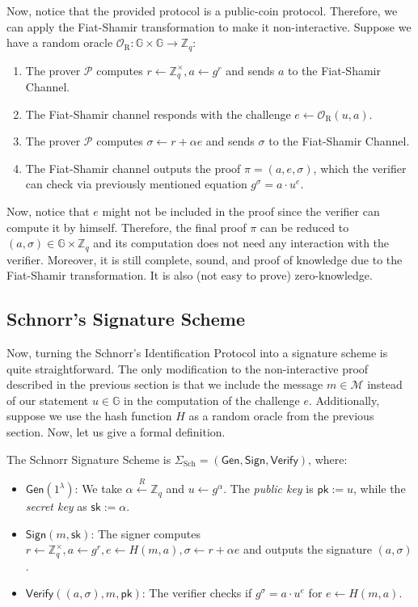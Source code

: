 \documentclass[../lecture-notes-148x210.tex]{subfiles}
\begin{document}
Now, notice that the provided protocol is a public-coin protocol. Therefore, we can apply the Fiat-Shamir transformation to make it non-interactive. Suppose we have a random oracle $\mathcal{O}_{\text{R}}: \mathbb{G} \times \mathbb{G} \to \mathbb{Z}_q$:
\begin{enumerate}
    \item The prover $\mathcal{P}$ computes $r \gets \mathbb{Z}_q^{\times}, a \gets g^{r}$ and sends $a$ to the Fiat-Shamir Channel.
    \item The Fiat-Shamir channel responds with the challenge $e \gets \mathcal{O}_{\text{R}}(u,a)$.
    \item The prover $\mathcal{P}$ computes $\sigma \gets r + \alpha e$ and sends $\sigma$ to the Fiat-Shamir Channel.
    \item The Fiat-Shamir channel outputs the proof $\pi = (a,e,\sigma)$, which the verifier can check via previously mentioned equation $g^{\sigma} = a \cdot u^e$.
\end{enumerate}

Now, notice that $e$ might not be included in the proof since the verifier can compute it by himself. Therefore, the final proof $\pi$ can be reduced to $(a,\sigma) \in \mathbb{G} \times \mathbb{Z}_q$ and its computation does not need any interaction with the verifier. Moreover, it is still complete, sound, and proof of knowledge due to the Fiat-Shamir transformation. It is also (not easy to prove) zero-knowledge.

\subsection{Schnorr's Signature Scheme}

Now, turning the Schnorr's Identification Protocol into a signature scheme is quite straightforward. The only modification to the non-interactive proof described in the previous section is that we include the message $m \in \mathcal{M}$ instead of our statement $u \in \mathbb{G}$ in the computation of the challenge $e$. Additionally, suppose we use the hash function $H$ as a random oracle from the previous section. Now, let us give a formal definition.

\begin{definition}
    The Schnorr Signature Scheme is $\Sigma_{\text{Sch}} = (\mathsf{Gen}, \mathsf{Sign}, \mathsf{Verify})$, where:
    \begin{itemize}
        \item $\mathsf{Gen}(1^{\lambda})$: We take $\alpha \xleftarrow{R} \mathbb{Z}_q$ and $u \gets g^{\alpha}$. The \textit{public key} is $\mathsf{pk} := u$, while the \textit{secret key} as $\mathsf{sk} := \alpha$.
        \item $\mathsf{Sign}(m,\mathsf{sk})$: The signer computes $r \gets \mathbb{Z}_q^{\times}, a \gets g^{r}, e \gets H(m, a), \sigma \gets r + \alpha e$ and outputs the signature $(a,\sigma)$.
        \item $\mathsf{Verify}((a, \sigma), m,\mathsf{pk})$: The verifier checks if $g^{\sigma} = a \cdot u^e$ for $e \gets H(m, a)$.
    \end{itemize}
\end{definition}
\end{document}
